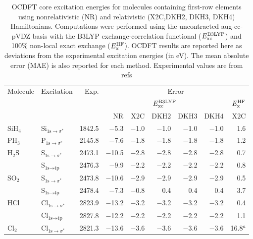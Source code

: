 \documentclass{article}
\begin{document}
\begin{table}[t!]
	\caption{OCDFT core excitation energies for molecules containing first-row elements using nonrelativistic (NR) and relativistic (X2C,DKH2, DKH3, DKH4) Hamiltonians. Computations were performed using the uncontracted aug-cc-pVDZ basis with the B3LYP exchange-correlation functional ($E^{\text{B3LYP}}_{\rm xc}$) and 100\% non-local exact exchange ($E^{\text{HF}}_{\rm x}$). OCDFT results are reported here as deviations from the experimental excitation energies (in eV).  The mean absolute error (MAE) is also reported for each method.
Experimental values are from refs }
	\centering
	\begin{tabular}{llrrrrrrr}
\toprule
Molecule & Excitation   & Exp.  & \multicolumn{6}{c}{Error} \\  \cmidrule(l){4-9}
&            &           &   \multicolumn{5}{c}{$E^{\text{B3LYP}}_{\rm xc}$} & $E^{\text{HF}}_{\rm x}$ \\ \cmidrule(l){4-8} 
&            &           &   NR &  ${\text{X2C}}$ & ${\text{DKH2}}$ & ${\text{DKH3}}$ & ${\text{DKH4}}$ & X2C \\
\midrule
SiH$_4$ & Si$_{\text{1s}\rightarrow\sigma^*}$ & 1842.5 & $-$5.3 & $-$1.0 & $-$1.0 & $-$1.0 & $-$1.0 & 1.6 \\
PH$_3$ & P$_{\text{1s}\rightarrow\sigma^*}$ & 2145.8 & $-$7.6 & $-$1.8 & $-$1.8 & $-$1.8 & $-$1.8 & 1.2 \\
H$_2$S & S$_{\text{1s}\rightarrow\sigma^*}$ & 2473.1 & $-$10.5 & $-$2.8 & $-$2.8 & $-$2.8 & $-$2.8 & 0.7 \\
 & S$_{\text{1s}\rightarrow\text{4p}}$ & 2476.3 & $-$9.9 & $-$2.2 & $-$2.2 & $-$2.2 & $-$2.2 & 0.8 \\
SO$_2$ & S$_{\text{1s}\rightarrow\pi^*}$ & 2473.8 & $-$10.6 & $-$2.9 & $-$2.9 & $-$2.9 & $-$2.9 & 0.5 \\
 & S$_{\text{1s}\rightarrow\text{4p}}$ & 2478.4 & $-$7.3 & $-$0.8 & 0.4 & 0.4 & 0.4 & 3.7 \\
HCl & Cl$_{\text{1s}\rightarrow\sigma^*}$ & 2823.9 & $-$13.2 & $-$3.2 & $-$3.2 & $-$3.2 & $-$3.2 & 0.4 \\
 & Cl$_{\text{1s}\rightarrow\text{4p}}$ & 2827.8 & $-$12.2 & $-$2.2 & $-$2.2 & $-$2.2 & $-$2.2 & 1.1 \\
Cl$_2$ & Cl$_{\text{1s}\rightarrow\sigma^*}$ & 2821.3 & $-$13.6 & $-$3.6 & $-$3.6 & $-$3.6 & $-$3.6 & 16.8$^{a}$ \\

\end{tabular}
\end{table}
\end{document}
